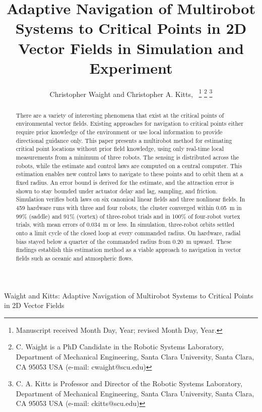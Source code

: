 \documentclass[lettersize,journal]{IEEEtran}
\newcommand{\rev}[1]{#1}
\begin{document}
\title{Adaptive Navigation of Multirobot Systems to Critical Points in 2D Vector Fields in Simulation and Experiment}
\author{Christopher Waight and Christopher A. Kitts,~
\thanks{Manuscript received Month Day, Year; revised Month Day, Year.}
\thanks{C. Waight is a PhD Candidate in the Robotic Systems Laboratory, Department of Mechanical Engineering, Santa Clara University, Santa Clara, CA 95053 USA (e-mail: cwaight@scu.edu)}
\thanks{C. A. Kitts is Professor and Director of the Robotic Systems Laboratory, Department of Mechanical Engineering, Santa Clara University, Santa Clara, CA 95053 USA (e-mail: ckitts@scu.edu)}
}
%
{Waight and Kitts: Adaptive Navigation of Multirobot Systems to Critical Points in 2D Vector Fields}


\maketitle

\begin{abstract}
    There are a variety of interesting phenomena that exist at the critical points of environmental vector fields. Existing approaches for navigation to critical points either require prior knowledge of the environment or use local information to provide directional guidance only. This paper presents a multirobot method for estimating critical point locations without prior field knowledge, using only real-time local measurements from a minimum of three robots. The sensing is distributed across the robots, while the estimate and control laws are computed on a central computer.
    This estimation enables new control laws to navigate to these points and to orbit them at a fixed radius.
    An error bound is derived for the estimate, and the attraction error is shown to stay bounded under actuator delay and lag, sampling, and friction.
    Simulation verifies both laws on six canonical linear fields and three nonlinear fields. In \rev{459} hardware runs with three and four robots, the cluster converged within 0.05~m in \rev{99}\% (saddle) and \rev{91}\% (vortex) of three-robot trials and in \rev{100}\% of four-robot vortex trials, with mean errors of \rev{0.034}~m or less. In simulation, three-robot orbits settled onto a limit cycle of the closed loop at every commanded radius. On hardware, radial bias stayed below a quarter of the commanded radius from \rev{0.20}~m upward.
    These findings establish this estimation method as a viable approach to navigation in vector fields such as oceanic and atmospheric flows.

\end{abstract}
\end{document}
